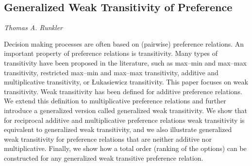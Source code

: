 \documentclass[../booklet.tex]{subfiles}
\begin{document}
\subsection[Generalized Weak Transitivity of Preference. {\it Thomas A. Runkler}]{Generalized Weak Transitivity of Preference}

\begin{center}
  {\it Thomas A. Runkler}
\end{center}

\vskip 0.8cm


Decision making processes are often based on 
(pairwise) preference relations.
An important property of preference relations
is transitivity.
Many types of transitivity have been proposed in the
literature, such as
max--min and max--max transitivity,
restricted max--min and max--max transitivity,
additive and multiplicative transitivity, or
{\L}ukasiewicz transitivity.
This paper focuses on weak transitivity.
Weak transitivity has been defined 
for additive preference relations.
We extend this definition to multiplicative preference 
relations and further introduce a generalized version called
generalized weak transitivity.
We show that
for reciprocal additive and multiplicative preference relations
weak transitivity is equivalent to
generalized weak transitivity,
and we also illustrate 
generalized weak transitivity
for preference relations that are neither additive nor multiplicative.
Finally,
we show how
a total order (ranking of the options) can
be constructed for any
generalized weak transitive preference relation.
\end{document}
